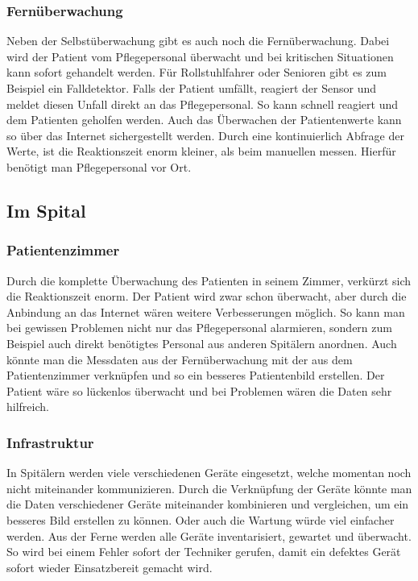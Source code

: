 \subsubsection{Fernüberwachung}
Neben der Selbstüberwachung gibt es auch noch die Fernüberwachung. Dabei wird der Patient vom Pflegepersonal überwacht und bei kritischen Situationen kann sofort gehandelt werden. Für Rollstuhlfahrer oder Senioren gibt es zum Beispiel ein Falldetektor. Falls der Patient umfällt, reagiert der Sensor und meldet diesen Unfall direkt an das Pflegepersonal. So kann schnell reagiert und dem Patienten geholfen werden. Auch das Überwachen der Patientenwerte kann so über das Internet sichergestellt werden. Durch eine kontinuierlich Abfrage der Werte, ist die Reaktionszeit enorm kleiner, als beim manuellen messen. Hierfür benötigt man Pflegepersonal vor Ort.
\subsection{Im Spital}
\subsubsection{Patientenzimmer}
Durch die komplette Überwachung des Patienten in seinem Zimmer, verkürzt sich die Reaktionszeit enorm. Der Patient wird zwar schon überwacht, aber durch die Anbindung an das Internet wären weitere Verbesserungen möglich. So kann man bei gewissen Problemen nicht nur das Pflegepersonal alarmieren, sondern zum Beispiel auch direkt benötigtes Personal aus anderen Spitälern anordnen. Auch könnte man die Messdaten aus der Fernüberwachung mit der aus dem Patientenzimmer verknüpfen und so ein besseres Patientenbild erstellen. Der Patient wäre so lückenlos überwacht und bei Problemen wären die Daten sehr hilfreich.
\subsubsection{Infrastruktur}
In Spitälern werden viele verschiedenen Geräte eingesetzt, welche momentan noch nicht miteinander kommunizieren. Durch die Verknüpfung der Geräte könnte man die Daten verschiedener Geräte miteinander kombinieren und vergleichen, um ein besseres Bild erstellen zu können. Oder auch die Wartung würde viel einfacher werden. Aus der Ferne werden alle Geräte inventarisiert, gewartet und überwacht. So wird bei einem Fehler sofort der Techniker gerufen, damit ein defektes Gerät sofort wieder Einsatzbereit gemacht wird. 
\newpage
